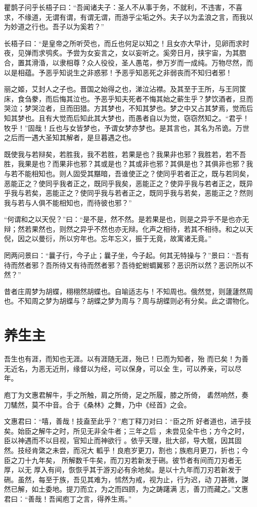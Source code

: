 \documentclass[12pt,UTF8]{ctexbook}
\begin{document}
瞿鹊子问乎长梧子曰：“吾闻诸夫子：圣人不从事于务，不就利，不违害，不喜求，不缘道，无谓有谓，有谓无谓，而游乎尘垢之外。夫子以为孟浪之言，而我以为妙道之行也。吾子以为奚若？”

长梧子曰：“是皇帝之所听荧也，而丘也何足以知之！且女亦大早计，见卵而求时夜，见弹而求鸮炙。予尝为女妄言之，女以妄听之。奚旁日月，挟宇宙，为其脗合，置其滑涽，以隶相尊？众人役役，圣人愚芚，参万岁而一成纯。万物尽然，而以是相蕴。予恶乎知说生之非惑邪！予恶乎知恶死之非弱丧而不知归者邪！

丽之姬，艾封人之子也。晋国之始得之也，涕泣沾襟。及其至于王所，与王同筐床，食刍豢，而后悔其泣也。予恶乎知夫死者不悔其始之蕲生乎？梦饮酒者，旦而哭泣；梦哭泣者，旦而田猎。方其梦也，不知其梦也。梦之中又占其梦焉，觉而后知其梦也。且有大觉而后知此其大梦也，而愚者自以为觉，窃窃然知之。“君乎！牧乎！”固哉！丘也与女皆梦也，予谓女梦亦梦也。是其言也，其名为吊诡。万世之后而一遇大圣知其解者，是旦暮遇之也。

既使我与若辩矣，若胜我，我不若胜，若果是也？我果非也邪？我胜若，若不吾胜，我果是也？而果非也邪？其或是也？其或非也邪？其俱是也？其俱非也邪？我与若不能相知也。则人固受其黮暗，吾谁使正之？使同乎若者正之，既与若同矣，恶能正之？使同乎我者正之，既同乎我矣，恶能正之？使异乎我与若者正之，既异乎我与若矣，恶能正之？使同乎我与若者正之，既同乎我与若矣，恶能正之？然则我与若与人俱不能相知也，而待彼也邪？”

“何谓和之以天倪？”曰：“是不是，然不然。是若果是也，则是之异乎不是也亦无辩；然若果然也，则然之异乎不然也亦无辩。化声之相待，若其不相待。和之以天倪，因之以曼衍，所以穷年也。忘年忘义，振于无竟，故寓诸无竟。”

罔两问景曰：“曩子行，今子止；曩子坐，今子起。何其无特操与？”景曰：“吾有待而然者邪？吾所待又有待而然者邪？吾待蛇蚹蜩翼邪？恶识所以然？恶识所以不然？”

昔者庄周梦为胡蝶，栩栩然胡蝶也。自喻适志与！不知周也。俄然觉，则蘧蘧然周也。不知周之梦为胡蝶与？胡蝶之梦为周与？周与胡蝶则必有分矣。此之谓物化。

\section{养生主}

吾生也有涯，而知也无涯。以有涯随无涯，殆已！已而为知者，殆 而已矣！为善无近名，为恶无近刑，缘督以为经，可以保身，可以全 生，可以养亲，可以尽年。

庖丁为文惠君解牛，手之所触，肩之所倚，足之所履，膝之所倚， 砉然响然，奏刀騞然，莫不中音。合于《桑林》之舞，乃中《经首》之会。

文惠君曰：“嘻，善哉！技盍至此乎？”庖丁释刀对曰：“臣之所 好者道也，进乎技矣。始臣之解牛之时，所见无非全牛者；三年之后 ，未尝见全牛也；方今之时，臣以神遇而不以目视，官知止而神欲行 。依乎天理，批大郤，导大髋，因其固然。技经肯綮之未尝，而况大 軱乎！良庖岁更刀，割也；族庖月更刀，折也；今臣之刀十九年矣， 所解数千牛矣，而刀刃若新发于硎。彼节者有间而刀刃者无厚，以无 厚入有间，恢恢乎其于游刃必有余地矣。是以十九年而刀刃若新发于 硎。虽然，每至于族，吾见其难为，怵然为戒，视为止，行为迟，动 刀甚微，謋然已解，如土委地。提刀而立，为之而四顾，为之踌躇满 志，善刀而藏之。”文惠君曰：“善哉！吾闻庖丁之言，得养生焉。”
\end{document}
